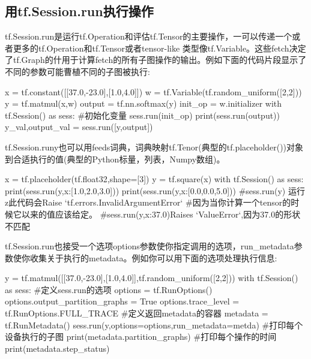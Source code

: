 \subsection{用tf.Session.run执行操作}
tf.Session.run是运行tf.Operation和评估tf.Tensor的主要操作，一可以传递一个或者更多的tf.Operation和tf.Tensor或者tensor-like 类型像tf.Variable。这些fetch决定了tf.Graph的什用于计算fetch的所有子图操作的输出。例如下面的代码片段显示了不同的参数可能曹植不同的子图被执行:
\begin{python}
x = tf.constant([[37.0,-23.0],[1.0,4.0]])
w = tf.Variable(tf.random_uniform([2,2]))
y = tf.matmul(x,w)
output = tf.nn.softmax(y)
init_op = w.initializer
with tf.Session() as sess:
#初始化变量
    sess.run(init_op)
    print(sess.run(output))
    y_val,output_val = sess.run([y,output])
\end{python}
tf.Session.runy也可以用feeds词典，词典映射tf.Tenor(典型的tf.placeholder())对象到合适执行的值(典型的Python标量，列表，Numpy数组)。
\begin{python}
x = tf.placeholder(tf.float32,shape=[3])
y = tf.square(x)
with tf.Session() as sess:
    print(sess.run(y,{x:[1.0,2.0,3.0]}))
    print(sess.run(y,{x:[0.0,0.0,5.0]}))
    #sess.run(y) 运行z此代码会Raise  `tf.errors.InvalidArgumentError`
    #因为当你计算一个tensor的时候它以来的值应该给定。
    #sess.run(y,{x:37.0})Raises `ValueError`,因为37.0的形状不匹配
\end{python}
tf.Session.run也接受一个选项options参数使你指定调用的选项，run\_metadata参数使你收集关于执行的metadata。例如你可以用下面的选项处理执行信息:
\begin{python}
y = tf.matmul([[37.0,-23.0],[1.0,4.0]],tf.random_uniform([2,2]))
with tf.Session() as sess:
	#定义sess.run的选项
    options = tf.RunOptions()
    options.output_partition_graphs = True
    options.trace_level = tf.RunOptions.FULL_TRACE
#定义返回metadata的容器
metadata = tf.RunMetadata()
sess.run(y,options=options,run_metadata=metda)
#打印每个设备执行的子图
print(metadata.partition_graphs)
#打印每个操作的时间
print(metadata.step_status)
\end{python}
